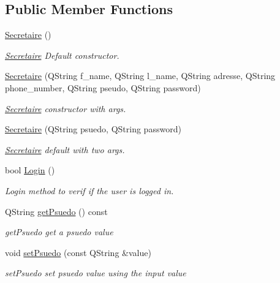 \subsection*{Public Member Functions}
\begin{DoxyCompactItemize}
\item 
\mbox{\label{class_secretaire_a332fd6a3866c3ac0f08b6b9a8b75516b}} 
\mbox{\hyperlink{class_secretaire_a332fd6a3866c3ac0f08b6b9a8b75516b}{Secretaire}} ()
\begin{DoxyCompactList}\small\item\em \mbox{\hyperlink{class_secretaire}{Secretaire}} Default constructor. \end{DoxyCompactList}\item 
\mbox{\hyperlink{class_secretaire_ae399f6f7212bbe9ba514a3a827aa95d9}{Secretaire}} (Q\+String f\+\_\+name, Q\+String l\+\_\+name, Q\+String adresse, Q\+String phone\+\_\+number, Q\+String pseudo, Q\+String password)
\begin{DoxyCompactList}\small\item\em \mbox{\hyperlink{class_secretaire}{Secretaire}} constructor with args. \end{DoxyCompactList}\item 
\mbox{\hyperlink{class_secretaire_a9df2696b2b6708755e7c4bee1be0d67a}{Secretaire}} (Q\+String psuedo, Q\+String password)
\begin{DoxyCompactList}\small\item\em \mbox{\hyperlink{class_secretaire}{Secretaire}} default with two args. \end{DoxyCompactList}\item 
bool \mbox{\hyperlink{class_secretaire_ae7eb96f900703ae3e74d6a40b60c7482}{Login}} ()
\begin{DoxyCompactList}\small\item\em Login method to verif if the user is logged in. \end{DoxyCompactList}\item 
Q\+String \mbox{\hyperlink{class_secretaire_a1331945f37877493d3f9f0384bff5347}{get\+Psuedo}} () const
\begin{DoxyCompactList}\small\item\em get\+Psuedo get a psuedo value \end{DoxyCompactList}\item 
void \mbox{\hyperlink{class_secretaire_aa43fc10abbaa9741fd4c98fcdd6e0ae6}{set\+Psuedo}} (const Q\+String \&value)
\begin{DoxyCompactList}\small\item\em set\+Psuedo set psuedo value using the input value \end{DoxyCompactList}\item 

\end{DoxyCompactItemize}
